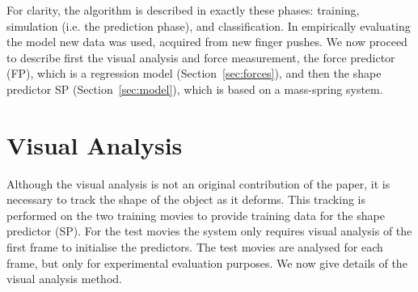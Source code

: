 \documentclass[journal]{IEEEtran}
\newcommand{\alref}[1]{Algorithm~\ref{#1}}
\newcounter{algorithm}
\begin{document}
For clarity, the algorithm is described in exactly these phases: training, simulation (i.e. the prediction phase), and classification. In empirically evaluating the model new data was used, acquired from new finger pushes. We now proceed to describe first the visual analysis and force measurement, the force predictor (FP), which is a regression model (Section~\ref{sec:forces}), and then the shape predictor SP (Section~\ref{sec:model}), which is based on a mass-spring system.

\section{Visual Analysis}
\label{sec:vision}

Although the visual analysis is not an original contribution of the paper, it is necessary to track the shape of the object as it deforms. This tracking is performed on the two training movies to provide training data for the shape predictor (SP). For the test movies the system only requires visual analysis of the first frame to initialise the predictors. The test movies are analysed for each frame, but only for experimental evaluation purposes. We now give details of the visual analysis method.
\end{document}
